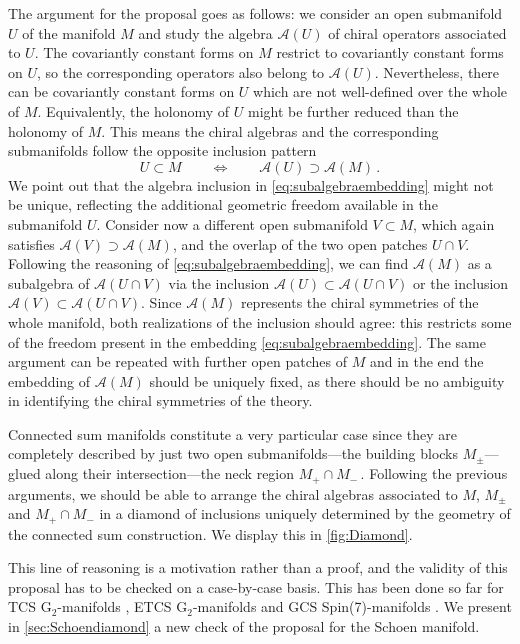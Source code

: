 \documentclass{pspum-l}
\theoremstyle{definition}
\theoremstyle{remark}
\numberwithin{equation}{section}
\begin{document}
The argument for the proposal goes as follows: we consider an open submanifold $U$ of the manifold $M$ and study the algebra $\mathcal{A}(U)$ of chiral operators associated to $U$. The covariantly constant forms on $M$ restrict to covariantly constant forms on $U$, so the corresponding operators also belong to $\mathcal{A}(U)$. Nevertheless, there can be covariantly constant forms on $U$ which are not well-defined over the whole of $M$. Equivalently, the holonomy of $U$ might be further reduced than the holonomy of $M$. This means the chiral algebras and the corresponding submanifolds follow the opposite inclusion pattern
\begin{equation}
\label{eq:subalgebraembedding}
U\subset M \qquad \Leftrightarrow \qquad \mathcal{A}(U)\supset \mathcal{A}(M) \, .
\end{equation}
We point out that the algebra inclusion in \eqref{eq:subalgebraembedding} might not be unique, reflecting the additional geometric freedom available in the submanifold $U$. Consider now a different open submanifold $V\subset M$, which again satisfies $\mathcal{A}(V)\supset \mathcal{A}(M)$, and the overlap of the two open patches $U\cap V$. Following the reasoning of \eqref{eq:subalgebraembedding}, we can find $\mathcal{A}(M)$ as a subalgebra of $\mathcal{A}(U\cap V)$ via the inclusion $\mathcal{A}(U)\subset \mathcal{A}(U\cap V)$ or the inclusion $\mathcal{A}(V)\subset \mathcal{A}(U\cap V)$. Since $\mathcal{A}(M)$ represents the chiral symmetries of the whole manifold, both realizations of the inclusion should agree: this restricts some of the freedom present in the embedding \eqref{eq:subalgebraembedding}. The same argument can be repeated with further open patches of $M$ and in the end the embedding of $\mathcal{A}(M)$ should be uniquely fixed, as there should be no ambiguity in identifying the chiral symmetries of the theory.

Connected sum manifolds constitute a very particular case since they are completely described by just two open submanifolds---the building blocks $M_\pm$---glued along their intersection---the neck region $M_+\cap M_-\,$. Following the previous arguments, we should be able to arrange the chiral algebras associated to $M$, $M_\pm$ and $M_+\cap M_-$ in a diamond of inclusions uniquely determined by the geometry of the connected sum construction. We display this in \cref{fig:Diamond}.

This line of reasoning is a motivation rather than a proof, and the validity of this proposal has to be checked on a case-by-case basis. This has been done so far for TCS G$_2$-manifolds \cite{Fiset:2018huv}, ETCS G$_2$-manifolds and GCS Spin(7)-manifolds \cite{Fiset:2021ruv}. We present in \cref{sec:Schoendiamond} a new check of the proposal for the Schoen manifold.
\end{document}
